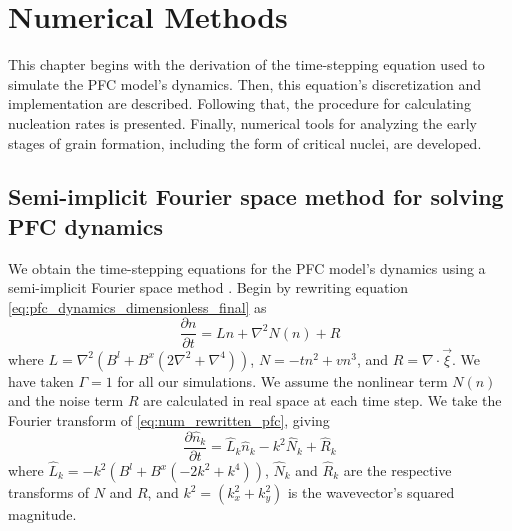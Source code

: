 \chapter{\sf Numerical Methods}\label{ch:numerics}

This chapter begins with the derivation of the time-stepping equation used to simulate the PFC model's dynamics. Then, this equation's discretization and implementation are described. Following that, the procedure for calculating nucleation rates is presented. Finally, numerical tools for analyzing the early stages of grain formation, including the form of critical nuclei, are developed.

\section{Semi-implicit Fourier space method for solving PFC dynamics}\label{sec:num_pfc}

We obtain the time-stepping equations for the PFC model's dynamics using a semi-implicit Fourier space method \cite{provatas_PFC}. Begin by rewriting equation \ref{eq:pfc_dynamics_dimensionless_final} as
\begin{equation}\label{eq:num_rewritten_pfc}
\frac{\partial n}{\partial t} = Ln + \nabla^2 N(n) + R
\end{equation}
where $L=\nabla^2(B^l +B^x (2\nabla^2+\nabla^4))$, $N=-tn^2+vn^3$, and $R=\nabla \cdot \vec\xi$. We have taken $\Gamma=1$ for all our simulations. We assume the nonlinear term $N(n)$ and the noise term $R$ are calculated in real space at each time step. We take the Fourier transform of \ref{eq:num_rewritten_pfc}, giving
\begin{equation}\label{eq:num_rewritten_pfc_fourier}
\frac{\partial \hat{n}_k}{\partial t} = \hat{L}_k \hat{n}_k - k^2 \hat{N}_k + \hat{R}_k
\end{equation}
where $\hat{L}_k = - k^2(B^l +B^x (-2k^2+k^4))$, $\hat{N}_k$ and $\hat{R}_k$ are the respective transforms of $N$ and $R$, and $k^2=(k_x^2+k_y^2)$ is the wavevector's squared magnitude.

